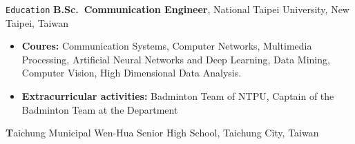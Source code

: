 \begin{rubric}{\faGraduationCap\texttt{Education}}
    \entry*[09.2016 -- 06.2020]%
    \textbf{B.Sc.~Communication Engineer}, National Taipei University, New Taipei, Taiwan
    \begin{itemize}[itemsep=0.5ex,parsep=0.5ex,topsep=0.5ex,partopsep=0.5ex, before={\vspace{-\baselineskip}\vspace{\itemsep}\parskip=0pt},
            after={\vspace{-\baselineskip}\vspace{-\itemsep}\parskip=0pt}]
        \item \textbf{Coures:} Communication Systems, Computer Networks, Multimedia Processing, Artificial Neural Networks and Deep Learning, Data Mining, Computer Vision, High Dimensional Data Analysis.
        \item \textbf{Extracurricular activities:} Badminton Team of NTPU, Captain of the Badminton Team at the Department
    \end{itemize}
    \entry*[08.2018 -- 08.2018]%
    \textbf Taichung Municipal Wen-Hua Senior High School, Taichung City, Taiwan
\end{rubric}
